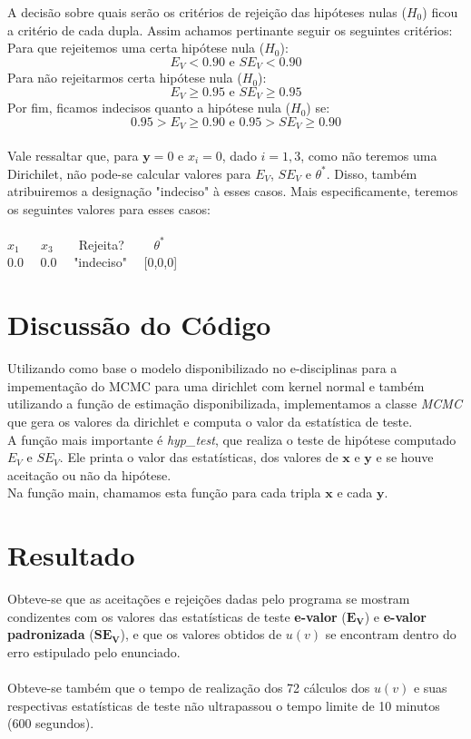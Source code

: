 \documentclass{article}
\begin{document}
    A decisão sobre quais serão os critérios de rejeição das hipóteses nulas ($H_{0}$) ficou a critério de cada dupla. Assim achamos pertinante seguir os seguintes critérios:
    $$ $$
    Para que rejeitemos uma certa hipótese nula ($H_{0}$):
        $$ E_V < 0.90 \text{ e } SE_V < 0.90 $$
    Para não rejeitarmos certa hipótese nula  ($H_{0}$):
        $$ E_V \geq 0.95 \text{ e } SE_V \geq 0.95 $$
    Por fim, ficamos indecisos quanto a hipótese nula  ($H_{0}$) se:
        $$ 0.95 > E_V \geq 0.90 \text{ e } 0.95 > SE_V \geq 0.90 $$
    \\
    Vale ressaltar que, para $\textbf{y} = 0$ e $x_{i} = 0$, dado $i = 1, 3$, como não teremos uma Dirichilet, não pode-se calcular valores para $E_V$, $SE_V$ e $\theta^*$. Disso, também atribuiremos a designação "indeciso" à esses casos. Mais especificamente, teremos os seguintes valores para esses casos:\\
    \\
    $x_{1}$ $ $ $ $ $ $ $ $ $x_{3}$ $ $ $ $ $ $ $ $ $ $ Rejeita? $ $ $ $ $ $ $ $ $ $ $ $ $ \theta^*$\\
     0.0  $ $ $ $ $ $ 0.0  $ $ $ $ $ $ "indeciso" $ $ $ $ $ $  [0,0,0]  

\section{Discussão do Código}

    Utilizando como base o modelo disponibilizado no e-disciplinas para a impementação do MCMC para uma dirichlet com kernel normal e também utilizando a função de estimação disponibilizada, implementamos a classe \textit{MCMC} que gera os valores da dirichlet e computa o valor da estatística de teste.\\
    
    A função mais importante é \textit{hyp\_test}, que realiza o teste de hipótese computado $E_V$ e $SE_V$. Ele printa o valor das estatísticas, dos valores de $\boldsymbol{x}$ e $\boldsymbol{y}$ e se houve aceitação ou não da hipótese.\\
    
    Na função main, chamamos esta função para cada tripla $\boldsymbol{x}$ e  cada $\boldsymbol{y}$.

\section{Resultado}

    Obteve-se que as aceitações e rejeições dadas pelo programa se mostram condizentes com os valores das estatísticas de teste \textbf{e-valor} ($\bm{E_V}$) e  \textbf{e-valor padronizada} ($\bm{SE_V}$), e que os valores obtidos de $u(v)$ se encontram dentro do erro estipulado pelo enunciado.\\
    \\
    Obteve-se também que o tempo de realização dos 72 cálculos dos $u(v)$ e suas respectivas estatísticas de teste não ultrapassou o tempo limite de 10 minutos (600 segundos).
\end{document}
